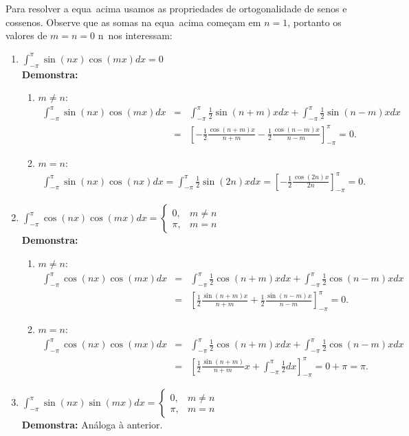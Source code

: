 Para resolver a equa\cao\ acima usamos as propriedades de ortogonalidade
de senos e cossenos. Observe que as somas na equa\cao\ acima come\c cam
em $n=1$, portanto os valores de $m=n=0$ n\ao\ nos interessam:
\begin{enumerate}
\item $\int_{-\pi}^{\pi} \sin (nx)\cos (mx)dx = 0$ \\
{\bf Demonstra\cao:}
\begin{enumerate}
\item $m \neq n$:
\begin{eqnarray*}
\int_{-\pi}^{\pi} \sin (nx)\cos (mx)dx &=&
    \int_{-\pi}^{\pi} \frac{1}{2} \sin (n+m)xdx
+ \int_{-\pi}^{\pi} \frac{1}{2}\sin (n-m)xdx \\
&=& \left[-\frac{1}{2}\frac{\cos(n+m)x}{n+m} 
    - \frac{1}{2}\frac{\cos(n-m)x}{n-m}\right]_{-\pi}^{\pi} = 0.
\end{eqnarray*}
\item $m = n$: 
\begin{eqnarray*}
\int_{-\pi}^{\pi} \sin (nx)\cos (nx)dx = \int_{-\pi}^{\pi} \frac{1}{2} \sin (2n)xdx 
= \left[-\frac{1}{2}\frac{\cos (2n)x}{2n}\right]_{-\pi}^{\pi} = 0.
\end{eqnarray*}
\end{enumerate}
\item $ \int_{-\pi}^{\pi} \cos (nx)\cos (mx)dx =
\left\{
\begin{array}{ll}  
 0, & m \neq n \\ 
 \pi, & m = n
\end{array}
\right.$ \\
{\bf Demonstra\cao:}
\begin{enumerate}
\item $m \neq n$:
\begin{eqnarray*} 
\int_{-\pi}^{\pi} \cos (nx)\cos (mx)dx &=& \int_{-\pi}^{\pi} \frac{1}{2}\cos (n+m)xdx
+ \int_{-\pi}^{\pi} \frac{1}{2}\cos (n-m)xdx \\
&=& \left[\frac{1}{2}\frac{\sin (n+m)x}{n+m} + \frac{1}{2}\frac{\sin (n-m)x}{n-m}\right]_{-\pi}^{\pi} = 0. 
\end{eqnarray*}
\item $m = n$: 
\begin{eqnarray*}
\int_{-\pi}^{\pi} \cos (nx)\cos (mx)dx &=& \int_{-\pi}^{\pi} \frac{1}{2}\cos (n+m)xdx
+ \int_{-\pi}^{\pi} \frac{1}{2}\cos (n-m)xdx \\
&=& \left[\frac{1}{2}\frac{\sin (n+m)}{n+m}x + \int_{-\pi}^{\pi} \frac{1}{2}dx\right]_{-\pi}^{\pi} = 0 + \pi = \pi.
\end{eqnarray*}
\end{enumerate}
\item $ \int_{-\pi}^{\pi} \sin (nx)\sin (mx)dx = 
\left\{
\begin{array}{ll}
0, &   m \neq n \\
\pi, &  m = n
\end{array}
\right.$  \\
{\bf Demonstra\cao:} An\'aloga \`a anterior.
\end{enumerate}

